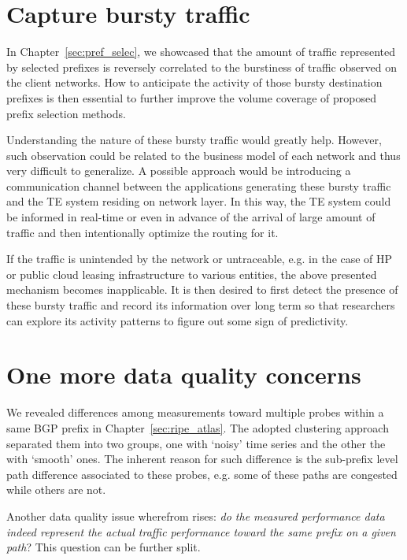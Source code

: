 \section{Capture bursty traffic}
In Chapter~\ref{sec:pref_selec}, we showcased that the amount of traffic represented by selected prefixes is reversely correlated to the burstiness of traffic observed on the client networks. How to anticipate the activity of those bursty destination prefixes is then essential to further improve the volume coverage of proposed prefix selection methods.

Understanding the nature of these bursty traffic would greatly help. However, such observation could be related to the business model of each network and thus very difficult to generalize. A possible approach would be introducing a communication channel between the applications generating these bursty traffic and the TE system residing on network layer. In this way, the TE system could be informed in real-time or even in advance of the arrival of large amount of traffic and then intentionally optimize the routing for it.

If the traffic is unintended by the network or untraceable, e.g. in the case of \ac{HP} or public cloud leasing infrastructure to various entities, the above presented mechanism becomes inapplicable. It is then desired to first detect the presence of these bursty traffic and record its information over long term so that researchers can explore its activity patterns to figure out some sign of predictivity.

\section{One more data quality concerns}
We revealed differences among measurements toward multiple probes within a same BGP prefix in Chapter~\ref{sec:ripe_atlas}. The adopted clustering approach separated them into two groups, one with `noisy' time series and the other the with `smooth' ones. The inherent reason for such difference is the sub-prefix level path difference associated to these probes, e.g. some of these paths are congested while others are not.

Another data quality issue wherefrom rises: \textit{do the measured performance data indeed represent the actual traffic performance toward the same prefix on a given path}?
This question can be further split. 

